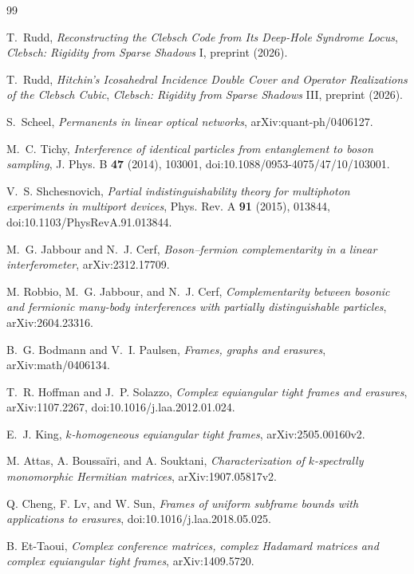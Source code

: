 \documentclass[11pt]{article}
\theoremstyle{remark}
\begin{document}
\begingroup
\raggedright
\small
\begin{thebibliography}{99}
\setlength{\itemsep}{0pt}

T.~Rudd,
\emph{Reconstructing the Clebsch Code from Its Deep-Hole Syndrome Locus},
\emph{Clebsch: Rigidity from Sparse Shadows} I, preprint (2026).

T.~Rudd,
\emph{Hitchin's Icosahedral Incidence Double Cover and Operator Realizations
of the Clebsch Cubic},
\emph{Clebsch: Rigidity from Sparse Shadows} III, preprint (2026).

S.~Scheel,
\emph{Permanents in linear optical networks},
arXiv:quant-ph/0406127.

M.~C. Tichy,
\emph{Interference of identical particles from entanglement to boson
sampling},
J. Phys. B \textbf{47} (2014), 103001,
doi:10.1088/0953-4075/47/10/103001.

V.~S. Shchesnovich,
\emph{Partial indistinguishability theory for multiphoton experiments in
multiport devices},
Phys. Rev. A \textbf{91} (2015), 013844,
doi:10.1103/PhysRevA.91.013844.

M.~G. Jabbour and N.~J. Cerf,
\emph{Boson--fermion complementarity in a linear interferometer},
arXiv:2312.17709.

M. Robbio, M.~G. Jabbour, and N.~J. Cerf,
\emph{Complementarity between bosonic and fermionic many-body interferences
with partially distinguishable particles},
arXiv:2604.23316.

B.~G. Bodmann and V.~I. Paulsen,
\emph{Frames, graphs and erasures},
arXiv:math/0406134.

T.~R. Hoffman and J.~P. Solazzo,
\emph{Complex equiangular tight frames and erasures},
arXiv:1107.2267, doi:10.1016/j.laa.2012.01.024.

E.~J. King,
\emph{\(k\)-homogeneous equiangular tight frames},
arXiv:2505.00160v2.

M. Attas, A. Boussa\"iri, and A. Souktani,
\emph{Characterization of \(k\)-spectrally monomorphic Hermitian matrices},
arXiv:1907.05817v2.

Q. Cheng, F. Lv, and W. Sun,
\emph{Frames of uniform subframe bounds with applications to erasures},
doi:10.1016/j.laa.2018.05.025.

B. Et-Taoui,
\emph{Complex conference matrices, complex Hadamard matrices and complex
equiangular tight frames},
arXiv:1409.5720.


\end{thebibliography}
\end{document}
